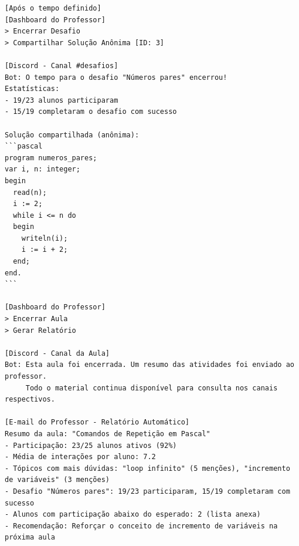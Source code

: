 \begin{lstlisting}
[Após o tempo definido]
[Dashboard do Professor]
> Encerrar Desafio
> Compartilhar Solução Anônima [ID: 3]

[Discord - Canal #desafios]
Bot: O tempo para o desafio "Números pares" encerrou!
Estatísticas:
- 19/23 alunos participaram
- 15/19 completaram o desafio com sucesso

Solução compartilhada (anônima):
```pascal
program numeros_pares;
var i, n: integer;
begin
  read(n);
  i := 2;
  while i <= n do
  begin
    writeln(i);
    i := i + 2;
  end;
end.
```

[Dashboard do Professor]
> Encerrar Aula
> Gerar Relatório

[Discord - Canal da Aula]
Bot: Esta aula foi encerrada. Um resumo das atividades foi enviado ao professor.
     Todo o material continua disponível para consulta nos canais respectivos.

[E-mail do Professor - Relatório Automático]
Resumo da aula: "Comandos de Repetição em Pascal"
- Participação: 23/25 alunos ativos (92%)
- Média de interações por aluno: 7.2
- Tópicos com mais dúvidas: "loop infinito" (5 menções), "incremento de variáveis" (3 menções)
- Desafio "Números pares": 19/23 participaram, 15/19 completaram com sucesso
- Alunos com participação abaixo do esperado: 2 (lista anexa)
- Recomendação: Reforçar o conceito de incremento de variáveis na próxima aula
\end{lstlisting}
